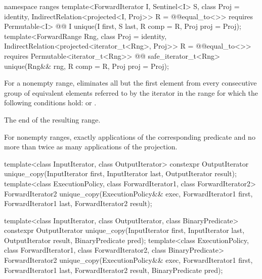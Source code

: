 \begin{addedblock}
%
\begin{itemdecl}
namespace ranges {
  template<ForwardIterator I, Sentinel<I> S, class Proj = identity,
      IndirectRelation<projected<I, Proj>> R = @@equal_to<>>
    requires Permutable<I>
    @@ I unique(I first, S last, R comp = R{}, Proj proj = Proj{});
  template<ForwardRange Rng, class Proj = identity,
      IndirectRelation<projected<iterator_t<Rng>, Proj>> R = @@equal_to<>>
    requires Permutable<iterator_t<Rng>>
    @@ safe_iterator_t<Rng>
      unique(Rng&& rng, R comp = R{}, Proj proj = Proj{});
}
\end{itemdecl}

\begin{itemdescr}
\pnum
\effects
For a nonempty range, eliminates all but the first element from every
consecutive group of equivalent elements referred to by the iterator
in the range
for which the following conditions hold:
or
.

\pnum
\returns
The end of the resulting range.

\pnum
\complexity
For nonempty ranges, exactly
applications of the corresponding predicate and no more than twice as many
applications of the projection.
\end{itemdescr}
\end{addedblock}

%
\begin{itemdecl}
template<class InputIterator, class OutputIterator>
  constexpr OutputIterator
    unique_copy(InputIterator first, InputIterator last,
                OutputIterator result);
template<class ExecutionPolicy, class ForwardIterator1, class ForwardIterator2>
  ForwardIterator2
    unique_copy(ExecutionPolicy&& exec,
                ForwardIterator1 first, ForwardIterator1 last,
                ForwardIterator2 result);

template<class InputIterator, class OutputIterator,
         class BinaryPredicate>
  constexpr OutputIterator
    unique_copy(InputIterator first, InputIterator last,
                OutputIterator result, BinaryPredicate pred);
template<class ExecutionPolicy, class ForwardIterator1, class ForwardIterator2,
         class BinaryPredicate>
  ForwardIterator2
    unique_copy(ExecutionPolicy&& exec,
                ForwardIterator1 first, ForwardIterator1 last,
                ForwardIterator2 result, BinaryPredicate pred);
\end{itemdecl}

